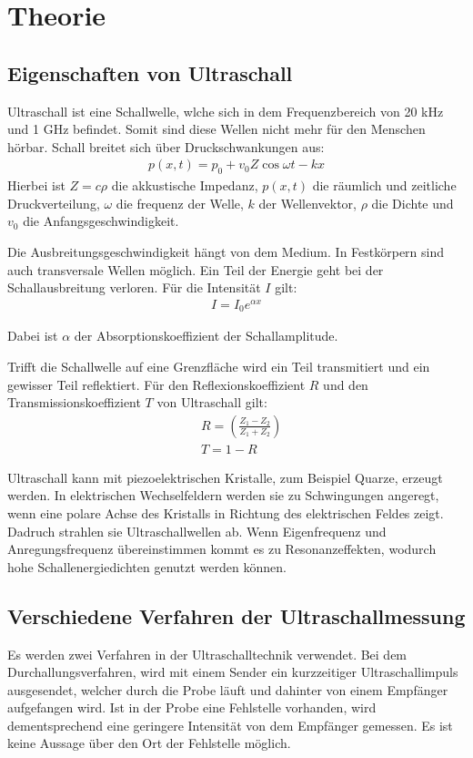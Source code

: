 \section{Theorie}
\label{sec:Theorie}

\subsection{Eigenschaften von Ultraschall}
Ultraschall ist eine Schallwelle, wlche sich in dem Frequenzbereich von 20 kHz und 1 GHz befindet. Somit sind diese
Wellen nicht mehr für den Menschen hörbar. Schall breitet sich über Druckschwankungen aus:
\begin{align}
  p(x,t) = p_0 + v_0 Z \cos{\omega t - k x}
\end{align}
Hierbei ist $Z= c \rho$ die akkustische Impedanz, $p(x, t)$ die räumlich und zeitliche Druckverteilung, $\omega$ die frequenz der Welle,
$k$ der Wellenvektor, $\rho$ die Dichte und $v_0$ die Anfangsgeschwindigkeit.

Die Ausbreitungsgeschwindigkeit hängt von dem Medium. In Festkörpern sind auch transversale Wellen möglich. Ein Teil der
Energie geht bei der Schallausbreitung verloren. Für die Intensität $I$ gilt:
\begin{align}
  I =I_0 e^{\alpha x}
\end{align}

Dabei ist $\alpha$ der Absorptionskoeffizient der Schallamplitude.

Trifft die Schallwelle auf eine Grenzfläche wird ein Teil transmitiert und ein gewisser Teil reflektiert.
Für den Reflexionskoeffizient $R$ und den Transmissionskoeffizient $T$ von Ultraschall gilt:
\begin{align}
  &R = \left( \frac{Z_1 - Z_2}{Z_1 + Z_2} \right) \\
  &T = 1 - R
\end{align}

Ultraschall kann mit piezoelektrischen Kristalle, zum Beispiel Quarze, erzeugt werden. In elektrischen Wechselfeldern werden
sie zu Schwingungen angeregt, wenn eine polare Achse des Kristalls in Richtung des elektrischen Feldes zeigt. Dadruch strahlen sie
Ultraschallwellen ab. Wenn Eigenfrequenz und Anregungsfrequenz übereinstimmen kommt es zu Resonanzeffekten, wodurch hohe Schallenergiedichten
genutzt werden können.


\subsection{Verschiedene Verfahren der Ultraschallmessung}
Es werden zwei Verfahren in der Ultraschalltechnik verwendet.
Bei dem Durchallungsverfahren, wird mit einem Sender ein kurzzeitiger Ultraschallimpuls ausgesendet, welcher
durch die Probe läuft und dahinter von einem Empfänger aufgefangen wird. Ist in der Probe eine Fehlstelle vorhanden, wird dementsprechend
eine geringere Intensität von dem Empfänger gemessen. Es ist keine Aussage über den Ort der Fehlstelle möglich.

